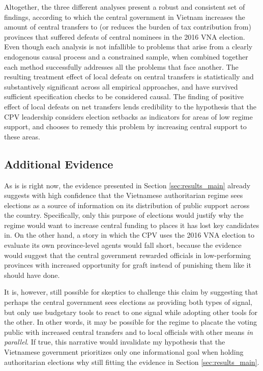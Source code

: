 \documentclass[12pt]{article}
\newcommand{\1}{\mathbbm{1}}
\begin{document}
Altogether, the three different analyses present a robust and consistent set of findings, according to which the central government in Vietnam increases the amount of central transfers to (or reduces the burden of tax contribution from) provinces that suffered defeats of central nominees in the 2016 VNA election. Even though each analysis is not infallible to problems that arise from a clearly endogenous causal process and a constrained sample, when combined together each method successfully addresses all the problems that face another. The resulting treatment effect of local defeats on central transfers is statistically and substantively significant across all empirical approaches, and have survived sufficient specification checks to be considered causal. The finding of positive effect of local defeats on net transfers lends credibility to the hypothesis that the CPV leadership considers election setbacks as indicators for areas of low regime support, and chooses to remedy this problem by increasing central support to these areas. 

\subsection{Additional Evidence}
\label{sec:results_mech}

As is is right now, the evidence presented in Section \ref{sec:results_main} already suggests with high confidence that the Vietnamese authoritarian regime sees elections as a source of information on its distribution of public support across the country. Specifically, only this purpose of elections would justify why the regime would want to increase central funding to places it has lost key candidates in. On the other hand, a story in which the CPV uses the 2016 VNA election to evaluate its own province-level agents would fall short, because the evidence would suggest that the central government rewarded officials in low-performing provinces with increased opportunity for graft instead of punishing them like it should have done. 

It is, however, still possible for skeptics to challenge this claim by suggesting that perhaps the central government sees elections as providing both types of signal, but only use budgetary tools to react to one signal while adopting other tools for the other. In other words, it may be possible for the regime to placate the voting public with increased central transfers and to local officials with other means \textit{in parallel}. If true, this narrative would invalidate my hypothesis that the Vietnamese government prioritizes only one informational goal when holding authoritarian elections why still fitting the evidence in Section \ref{sec:results_main}. 
\end{document}
